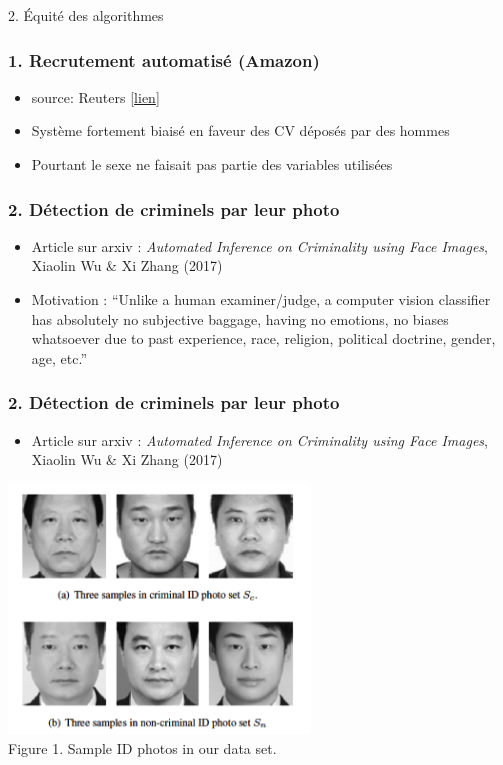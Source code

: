 \documentclass[sans,14pt]{beamer}
\begin{document}
{\begin{frame}
  \begin{center}
    \Large 2. Équité des algorithmes
  \end{center}
\end{frame}

\begin{frame}[t]
  \frametitle{1. Recrutement automatisé (Amazon)}
  \begin{itemize}
  \item[] {\footnotesize \hfill source: Reuters [\href{https://www.reuters.com/article/us-amazon-com-jobs-automation-insight-idUSKCN1MK08G}{lien}]}
  \item Système fortement biaisé en faveur des CV déposés par des hommes
  \item Pourtant le sexe ne faisait pas partie des variables utilisées
    \vfill
  \end{itemize}
\end{frame}

\begin{frame}[t]
  \frametitle{2. Détection de criminels par leur photo}
  \begin{itemize}
  \item Article sur arxiv : \textit{Automated Inference on Criminality using
      Face Images}, Xiaolin Wu \& Xi Zhang (2017)
  \item Motivation : \textcolor{MyBlue}{``Unlike a human examiner/judge, a
      computer vision classifier has absolutely no subjective baggage, having
      no emotions, no biases whatsoever due to past experience, race, religion,
      political doctrine, gender, age, etc.''}
  \end{itemize}
\end{frame}

\begin{frame}[t]
  \frametitle{2. Détection de criminels par leur photo}
  \begin{itemize}
  \item Article sur arxiv : \textit{Automated Inference on Criminality using
      Face Images}, Xiaolin Wu \& Xi Zhang (2017)
  \end{itemize}
  \begin{center}
    \includegraphics[width=0.6\textwidth]{figures/criminals_wu_zhang_2016} \\
    \footnotesize Figure 1. Sample ID photos in our data set.
  \end{center}
\end{frame}

}
\end{document}
